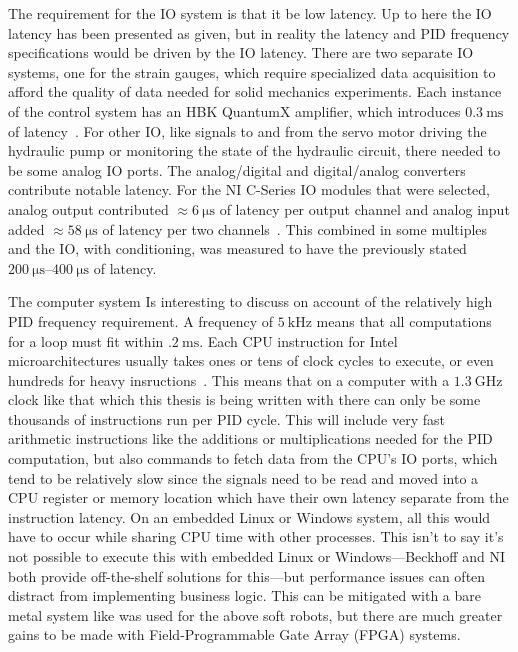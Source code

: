 \documentclass[english,12pt,a4paper,pdftex,eng,utf8]{aaltothesis}
\begin{document}
The requirement for the IO system is that it be low latency.  Up to here the IO latency has been presented as given, but in reality the latency and PID
frequency specifications would be driven by the IO latency.  There are two separate IO systems, one for the strain gauges, which require specialized data acquisition to afford the quality of data needed for solid mechanics experiments.  Each instance of the control system has an HBK QuantumX amplifier, which introduces $\qty{0.3}{\milli\second}$ of latency~\cite{HBKQuantumX}.  For other IO, like signals to and from the servo motor driving the hydraulic pump or monitoring the state of the hydraulic circuit, there needed to be some analog IO ports.  The analog/digital and digital/analog converters contribute notable latency.  For the NI C-Series IO modules that were selected, analog output contributed $\approx\qty{6}{\micro\second}$ of latency per output channel and analog input added $\approx\qty{58}{\micro\second}$ of latency per two channels~\cite{NI-9218,NI-9266}.  This combined in some multiples and the IO, with conditioning, was measured to have the previously stated $ \qtyrange[range-units=single,range-phrase=..]{200}{400}{\micro\second}$ of latency.

The computer system Is interesting to discuss on account of the relatively high PID frequency requirement.  A frequency of $\qty{5}{\kilo\hertz}$ means that all computations for a loop must fit within $\qty{.2}{\milli\second}$.  Each CPU instruction for Intel microarchitectures usually takes ones or tens of clock cycles to execute, or even hundreds for heavy insructions~\cite{Abel19a}.  This means that on a computer with a $\qty{1.3}{\giga\hertz}$ clock like that which this thesis is being written with there can only be some thousands of instructions run per PID cycle.  This will include very fast arithmetic instructions like the additions or multiplications needed for the PID computation, but also commands to fetch data from the CPU's IO ports, which tend to be relatively slow since the signals need to be read and moved into a CPU register or memory location which have their own latency separate from the instruction latency.  On an embedded Linux or Windows system, all this would have to occur while sharing CPU time with other processes.  This isn't to say it's not possible to execute this with embedded Linux or Windows---Beckhoff and NI both provide off-the-shelf solutions for this---but performance issues can often distract from implementing business logic.  This can be mitigated with a bare metal system like was used for the above soft robots, but there are much greater gains to be made with Field-Programmable Gate Array (FPGA) systems.
\end{document}
